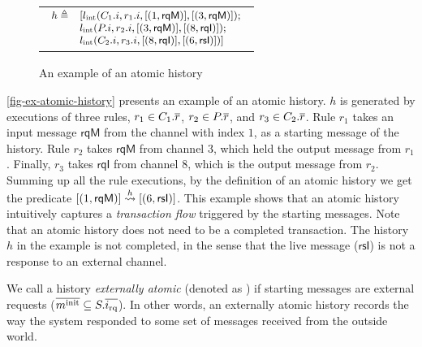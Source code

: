 \documentclass[sigplan,10pt,review,anonymous,screen]{acmart}\settopmatter{printfolios=true,printccs=false,printacmref=false}
\begin{document}
\begin{figure}[h]
\begin{tabular}{c}
\begin{tikzpicture}
    \end{tikzpicture}\\
    \hline
    \begin{math}
      \small
      \begin{array}{rl}
        h \triangleq & [\lblInt{\idxOf{C_1}}{\idxOf{r_1}}{\listsingle{(1, \textsf{rqM})}}{\listsingle{(3, \textsf{rqM})}};\\
        & \lblInt{\idxOf{P}}{\idxOf{r_2}}{\listsingle{(3, \textsf{rqM})}}{\listsingle{(8, \textsf{rqI})}};\\
        & \lblInt{\idxOf{C_2}}{\idxOf{r_3}}{\listsingle{(8, \textsf{rqI})}}{\listsingle{(6, \textsf{rsI})}}]\\
      \end{array}
    \end{math}
  \end{tabular}
  \caption{An example of an atomic history}
  \vspace{-5pt}
  \label{fig-ex-atomic-history}
\end{figure}

\autoref{fig-ex-atomic-history} presents an example of an atomic history.
$h$ is generated by executions of three rules, $r_1 \in \hobjrules{C_1}$, $r_2 \in \hobjrules{P}$, and $r_3 \in \hobjrules{C_2}$.
Rule $r_1$ takes an input message $\textsf{rqM}$ from the channel with index $1$, as a starting message of the history.
Rule $r_2$ takes $\textsf{rqM}$ from channel $3$, which held the output message from $r_1$.
Finally, $r_3$ takes $\textsf{rqI}$ from channel $8$, which is the output message from $r_2$.
Summing up all the rule executions, by the definition of an atomic history we get the predicate $\atomic{\listsingle{(1,\textsf{rqM})}}{h}{\listsingle{(6,\textsf{rsI})}}$.
This example shows that an atomic history intuitively captures a \emph{transaction flow} triggered by the starting messages.
Note that an atomic history does not need to be a completed transaction.
The history $h$ in the example is not completed, in the sense that the live message ($\textsf{rsI}$) is not a response to an external channel.

We call a history \emph{externally atomic} (denoted as ) if starting
messages are external requests ($\listof{\amsgi{m}} \subseteq \hsysRqA{S}$).
In other words, an externally atomic history records the way the system responded to some set of messages received from the outside world.
\end{document}
